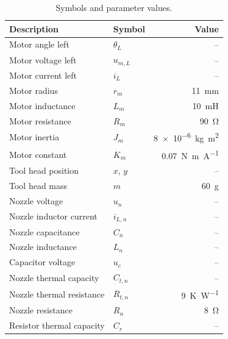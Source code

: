 \begin{table}[H]
  \centering
  \caption{Symbols and parameter values.}
  \label{tab:symbols}
  \begin{tabular}{llr}
    \toprule
    Description & Symbol & Value \\
    \midrule
    Motor angle left                  & $\theta_L$      & -- \\
    Motor voltage left                & $u_{m,L}$       & -- \\
    Motor current left                & $i_L$           & -- \\
    Motor radius                      & $r_m$           & \qty{11}{\milli\metre} \\
    Motor inductance                  & $L_m$           & \qty{10}{\milli\henry} \\
    Motor resistance                  & $R_m$           & \qty{90}{\ohm} \\
    Motor inertia                     & $J_m$           & \qty{8e-6}{\kilogram\metre\squared} \\
    Motor constant                    & $K_m$           & \qty{0.07}{\newton\metre\per\ampere} \\
    \midrule
    Tool head position                & $x$, $y$        & -- \\
    Tool head mass                    & $m$             & \qty{60}{\gram} \\
    \midrule
    Nozzle voltage                    & $u_n$           & -- \\
    Nozzle inductor current           & $i_{L,n}$       & -- \\
    Nozzle capacitance                & $C_n$           & -- \\
    Nozzle inductance                 & $L_n$           & -- \\
    Capacitor voltage                 & $u_c$           & -- \\
    Nozzle thermal capacity           & $C_{t,n}$       & -- \\
    Nozzle thermal resistance         & $R_{t,n}$       & \qty{9}{\kelvin\per\watt} \\
    Nozzle resistance                 & $R_n$           & \qty{8}{\ohm} \\
    Resistor thermal capacity         & $C_r$           & -- \\

\end{tabular}
\end{table}
